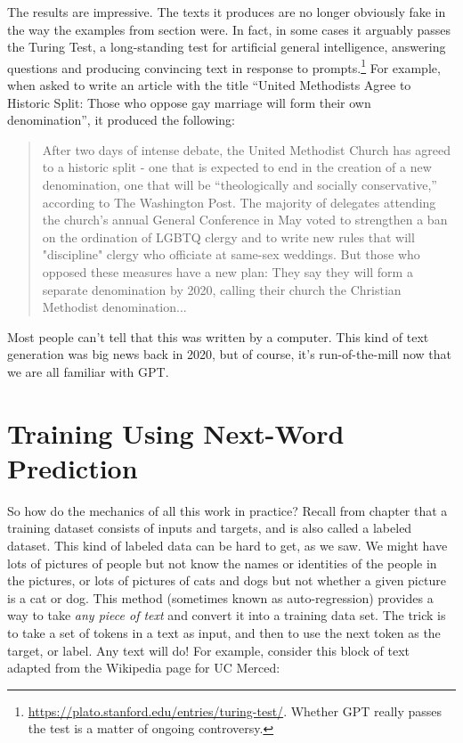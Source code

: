 The results are impressive. The texts it produces are no longer obviously fake in the way the examples from section  were. In fact, in some cases it arguably passes the Turing Test, a long-standing test for artificial general intelligence, answering questions and producing convincing  text in response to prompts.\footnote{\url{https://plato.stanford.edu/entries/turing-test/}. Whether GPT really passes the test is a matter of ongoing controversy.} For example, when asked to write an article with the title ``United Methodists Agree to Historic Split: Those who oppose gay marriage will form their own denomination'', it produced the following:
\begin{quote}
After two days of intense debate, the United Methodist Church has agreed to a historic split - one that is expected to end in the creation of a new denomination, one that will be ``theologically and socially conservative,'' according to The Washington Post. The majority of delegates attending the church's annual General Conference in May voted to strengthen a ban on the ordination of LGBTQ clergy and to write new rules that will "discipline" clergy who officiate at same-sex weddings. But those who opposed these measures have a new plan: They say they will form a separate denomination by 2020, calling their church the Christian Methodist denomination...
\end{quote}
Most people can't tell that this was written by a computer.  This kind of text generation was big news back in 2020, but of course, it's run-of-the-mill now that we are all familiar with GPT.

\section{Training Using Next-Word Prediction}

So how do the mechanics of all this work in practice? Recall from chapter  that a training dataset consists of inputs and targets, and is also called a labeled dataset. This kind of labeled data can be hard to get, as we saw.  We might have lots of pictures of people but not know the names or identities of the people in the pictures, or lots of pictures of cats and dogs but not whether a given picture is a cat or dog.  This method (sometimes known as auto-regression) provides a way to take \emph{any piece of text} and convert it into a training data set. The trick is to take a set of tokens in a text as input, and then to use the next token as the target, or label.  Any text will do! For example, consider this block of text adapted from the Wikipedia page for UC Merced:

